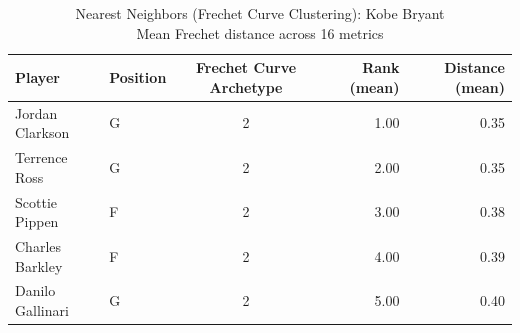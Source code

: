 \begin{table}[t]
\caption*{
{\fontsize{20}{25} Nearest Neighbors (Frechet Curve Clustering): Kobe Bryant\fontsize{12}{15}\selectfont } \\ 
{\fontsize{14}{17}\selectfont  Mean Frechet distance across 16 metrics\fontsize{12}{15}\selectfont }
} 
\fontsize{12.0pt}{14.0pt}\selectfont
\begin{tabular*}{\linewidth}{@{\extracolsep{\fill}}llcrr}
\toprule
Player & Position & Frechet Curve Archetype & Rank (mean) & Distance (mean) \\ 
\midrule\addlinespace[2.5pt]
Jordan Clarkson & G & 2 & 1.00 & 0.35 \\ 
Terrence Ross & G & 2 & 2.00 & 0.35 \\ 
Scottie Pippen & F & 2 & 3.00 & 0.38 \\ 
Charles Barkley & F & 2 & 4.00 & 0.39 \\ 
Danilo Gallinari & G & 2 & 5.00 & 0.40 \\ 
\bottomrule
\end{tabular*}
\end{table}


